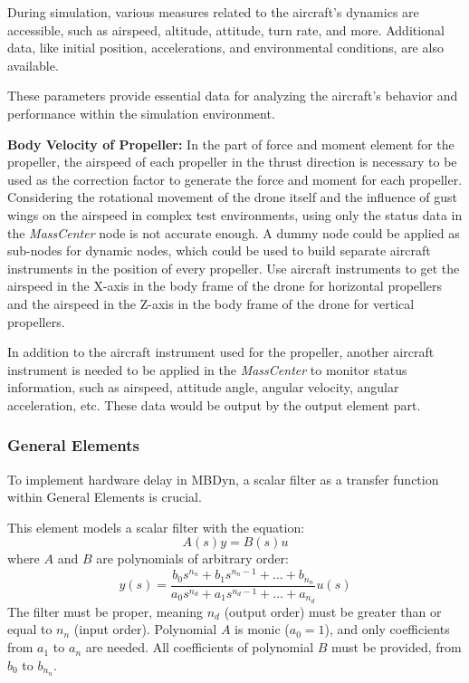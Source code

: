 During simulation, various measures related to the aircraft's dynamics are accessible, such as airspeed, altitude, attitude, turn rate, and more. Additional data, like initial position, accelerations, and environmental conditions, are also available.

These parameters provide essential data for analyzing the aircraft's behavior and performance within the simulation environment.

\textbf{Body Velocity of Propeller:} In the part of force and moment element for the propeller, the airspeed of each propeller in the thrust direction is necessary to be used as the correction factor to generate the force and moment for each propeller. Considering the rotational movement of the drone itself and the influence of gust wings on the airspeed in complex test environments, using only the status data in the \textit{MassCenter} node is not accurate enough. A dummy node could be applied as sub-nodes for dynamic nodes, which could be used to build separate aircraft instruments in the position of every propeller. Use aircraft instruments to get the airspeed in the X-axis in the body frame of the drone for horizontal propellers and the airspeed in the Z-axis in the body frame of the drone for vertical propellers.

In addition to the aircraft instrument used for the propeller, another aircraft instrument is needed to be applied in the \textit{MassCenter} to monitor status information, such as airspeed, attitude angle, angular velocity, angular acceleration, etc. These data would be output by the output element part.

\subsubsection{General Elements}

To implement hardware delay in MBDyn, a scalar filter as a transfer function within General Elements is crucial.

This element models a scalar filter with the equation:
\begin{equation}
    A(s) y = B(s) u
\end{equation}
where \( A \) and \( B \) are polynomials of arbitrary order:
\begin{equation}
    y(s) = \frac{{b_0 s^{n_n} + b_1 s^{n_n-1} + \ldots + b_{n_n}}}{{a_0 s^{n_d} + a_1 s^{n_d-1} + \ldots + a_{n_d}}}u(s) 
\end{equation}
The filter must be proper, meaning \( n_d \) (output order) must be greater than or equal to \( n_n \) (input order). Polynomial \( A \) is monic (\( a_0 = 1 \)), and only coefficients from \( a_1 \) to \( a_n \) are needed. All coefficients of polynomial \( B \) must be provided, from \( b_0 \) to \( b_{n_n} \).

